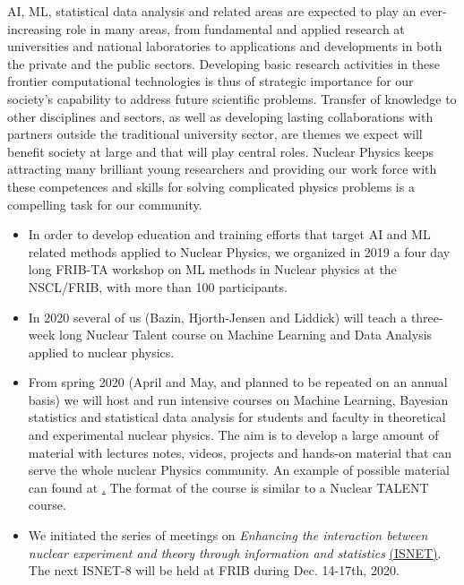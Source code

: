 \documentclass[%
10pt]{article}
\begin{document}
AI, ML, statistical data analysis and related areas are expected to
play an ever-increasing role in many areas, from fundamental and
applied research at universities and national laboratories to
applications and developments in both the private and the public
sectors.
Developing basic research activities in these frontier
computational technologies is thus of strategic importance for our
society’s capability to address future scientific problems. Transfer
of knowledge to other disciplines and sectors, as well as developing
lasting collaborations with partners outside the traditional
university sector, are themes we expect will benefit society at large
and that will play central roles. Nuclear Physics keeps attracting many brilliant young researchers and providing our work force with these competences and skills for solving complicated physics problems is a compelling task for our community.


\begin{itemize}

\item In order to develop education and training efforts that target AI and ML related methods applied to Nuclear Physics, we  organized in 2019 a four day long  FRIB-TA workshop on ML methods in Nuclear physics at the NSCL/FRIB, with more than 100 participants.

\item In 2020 several of us (Bazin, Hjorth-Jensen and Liddick) will teach a three-week long Nuclear Talent course on Machine Learning and Data Analysis applied to nuclear physics. 


\item From spring 2020 (April and May, and planned to be repeated on an annual basis) we will host and run intensive courses on Machine Learning, Bayesian statistics and statistical data analysis for students and faculty in theoretical and experimental nuclear physics. The aim is to develop a large amount of material with lectures notes, videos, projects and hands-on material that can serve the whole nuclear Physics community. An example of possible material can found at \href{https://compphysics.github.io/MachineLearning/doc/web/course.html}.  The format of the course is similar to a Nuclear TALENT course.

\item
We initiated the series of meetings on {\it Enhancing the interaction between nuclear experiment and theory through information and statistics} \href{https://iopscience.iop.org/journal/0954-3899/page/ISNET}{(ISNET)}.  The next ISNET-8 will be held at FRIB during  Dec. 14-17th, 2020.

\end{itemize}
\end{document}
